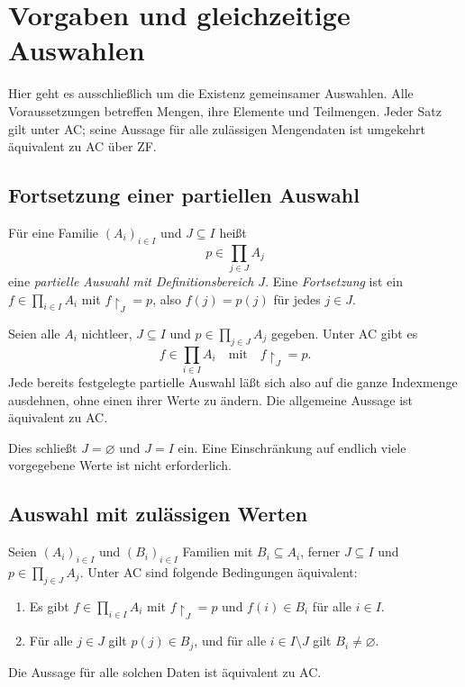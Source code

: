 \chapter{Vorgaben und gleichzeitige Auswahlen}
\label{b09guide:ch:selections}

Hier geht es ausschließlich um die Existenz gemeinsamer Auswahlen.
Alle Voraussetzungen betreffen Mengen, ihre Elemente und
Teilmengen. Jeder Satz gilt unter AC; seine Aussage für alle
zulässigen Mengendaten ist umgekehrt äquivalent zu AC über ZF.

\section{Fortsetzung einer partiellen Auswahl}

\begin{definition}
Für eine Familie $(A_i)_{i\in I}$ und $J\subseteq I$ heißt
\[
 p\in\prod_{j\in J}A_j
\]
eine \emph{partielle Auswahl mit Definitionsbereich $J$}.
Eine \emph{Fortsetzung} ist ein $f\in\prod_{i\in I}A_i$
mit $f\restriction_J=p$, also $f(j)=p(j)$ für jedes $j\in J$.
\end{definition}

\begin{theorem}
\label{b09guide:thm:extension}
Seien alle $A_i$ nichtleer, $J\subseteq I$ und
$p\in\prod_{j\in J}A_j$ gegeben. Unter AC gibt es
\[
 f\in\prod_{i\in I}A_i
 \quad\text{mit}\quad f\restriction_J=p.
\]
Jede bereits festgelegte partielle Auswahl läßt sich also
auf die ganze Indexmenge ausdehnen, ohne einen ihrer Werte zu ändern.
Die allgemeine Aussage ist äquivalent zu AC.
\end{theorem}

Dies schließt $J=\varnothing$ und $J=I$ ein. Eine Einschränkung auf
endlich viele vorgegebene Werte ist nicht erforderlich.

\section{Auswahl mit zulässigen Werten}

\begin{theorem}
\label{b09guide:thm:constraints}
Seien $(A_i)_{i\in I}$ und $(B_i)_{i\in I}$ Familien mit
$B_i\subseteq A_i$, ferner $J\subseteq I$ und
$p\in\prod_{j\in J}A_j$.
Unter AC sind folgende Bedingungen äquivalent:
\begin{enumerate}
\item Es gibt $f\in\prod_{i\in I}A_i$ mit
      $f\restriction_J=p$ und $f(i)\in B_i$ für alle $i\in I$.
\item Für alle $j\in J$ gilt $p(j)\in B_j$, und für alle
      $i\in I\setminus J$ gilt $B_i\ne\varnothing$.
\end{enumerate}
Die Aussage für alle solchen Daten ist äquivalent zu AC.
\end{theorem}

